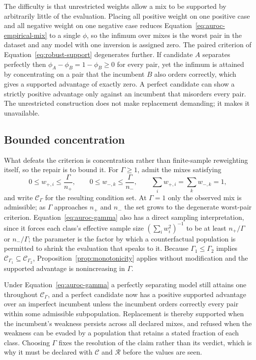 \documentclass[11pt]{article}
\newcommand{\Regime}{\mathcal{R}}
\newcommand{\CSet}{\mathcal{C}}
\theoremstyle{remark}
\begin{document}
The difficulty is that unrestricted weights allow a mix to be supported by
arbitrarily little of the evaluation. Placing all positive weight on one
positive case and all negative weight on one negative case reduces
Equation~\eqref{eq:auroc-empirical-mix} to a single $\phi$, so the infimum over
mixes is the worst pair in the dataset and any model with one inversion is
assigned zero. The paired criterion of Equation~\eqref{eq:robust-support}
degenerates further. If candidate $A$ separates perfectly then
$\phi_A-\phi_B=1-\phi_B\geq0$ for every pair, yet the infimum is attained by
concentrating on a pair that the incumbent $B$ also orders correctly, which
gives a supported advantage of exactly zero. A perfect candidate can show a
strictly positive advantage only against an incumbent that misorders every
pair. The unrestricted construction does not make replacement demanding; it
makes it unavailable.

\subsection{Bounded concentration}

What defeats the criterion is concentration rather than finite-sample
reweighting itself, so the repair is to bound it. For $\Gamma\geq1$, admit the
mixes satisfying
\begin{equation}
0\leq w_{+,i}\leq\frac{\Gamma}{n_+},
\qquad
0\leq w_{-,k}\leq\frac{\Gamma}{n_-},
\qquad
\sum_i w_{+,i}=\sum_k w_{-,k}=1,
\label{eq:auroc-gamma}
\end{equation}
and write $\CSet_\Gamma$ for the resulting condition set. At $\Gamma=1$ only
the observed mix is admissible; as $\Gamma$ approaches $n_+$ and $n_-$ the set
grows to the degenerate worst-pair criterion. Equation~\eqref{eq:auroc-gamma}
also has a direct sampling interpretation, since it forces each class's
effective sample size $(\sum_i w_i^2)^{-1}$ to be at least $n_+/\Gamma$ or
$n_-/\Gamma$; the parameter is the factor by which a counterfactual population
is permitted to shrink the evaluation that speaks to it. Because
$\Gamma_1\leq\Gamma_2$ implies $\CSet_{\Gamma_1}\subseteq\CSet_{\Gamma_2}$,
Proposition~\ref{prop:monotonicity} applies without modification and the
supported advantage is nonincreasing in $\Gamma$.

Under Equation~\eqref{eq:auroc-gamma} a perfectly separating model still
attains one throughout $\CSet_\Gamma$, and a perfect candidate now has a
positive supported advantage over an imperfect incumbent unless the incumbent
orders correctly every pair within some admissible subpopulation. Replacement
is thereby supported when the incumbent's weakness persists across all declared
mixes, and refused when the weakness can be evaded by a population that retains
a stated fraction of each class. Choosing $\Gamma$ fixes the resolution of the
claim rather than its verdict, which is why it must be declared with $\CSet$
and $\Regime$ before the values are seen.
\end{document}
